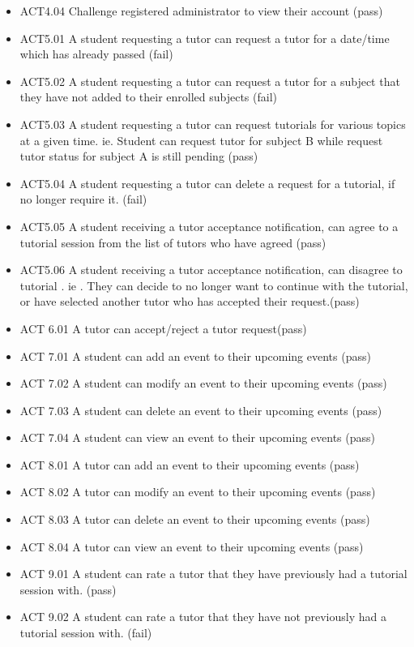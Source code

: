 \documentclass[12pt]{article}
\begin{document}
\begin{itemize}
\item ACT4.04	Challenge registered administrator to view their account (pass)
\item ACT5.01	A student requesting a tutor can request a tutor for a date/time which has already passed  (fail)
\item ACT5.02	A student requesting a tutor can request a tutor for a subject that they have not added to their enrolled subjects  (fail)
\item ACT5.03	A student requesting a tutor can request tutorials for various topics at a given time. ie. Student can request tutor for subject B while request tutor status for subject A is still pending (pass)
\item ACT5.04	A student requesting a tutor can delete a request for a  tutorial, if no longer require it. (fail)
\item ACT5.05	A student receiving a tutor acceptance notification, can agree to a tutorial session from the list  of tutors who have agreed (pass)
\item ACT5.06 A student receiving a tutor acceptance notification, can disagree to tutorial . ie . They can decide to no longer want to continue with the tutorial, or have selected another tutor who has accepted their request.(pass)		%
\item ACT 6.01 A tutor can accept/reject a tutor request(pass)
\item ACT 7.01 A student can add an event to their upcoming events (pass)
\item ACT 7.02 A student can modify an event to their upcoming events (pass)
\item ACT 7.03 A student can delete an event to their upcoming events (pass)
\item ACT 7.04 A student can view an event to their upcoming events (pass)
\item ACT 8.01 A tutor can add an event to their upcoming events (pass)
\item ACT 8.02 A tutor can modify an event to their upcoming events (pass)
\item ACT 8.03 A tutor can delete an event to their upcoming events (pass)
\item ACT 8.04 A tutor can view an event to their upcoming events (pass)
\item ACT 9.01 A student can rate a tutor that they have previously had a tutorial session with. (pass)
\item ACT 9.02 A student can rate a tutor that they have not previously had a tutorial session with. (fail)

\end{itemize}
\end{document}
